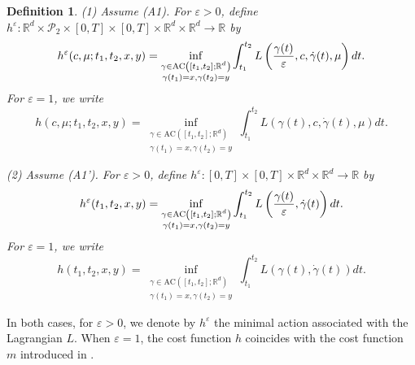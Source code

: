 \documentclass[reqno,11pt]{amsart}
\newtheorem{definition}[theorem]{Definition}
\numberwithin{equation}{section}
\newcommand{\R}{\mathbb{R}} %
\newcommand{\e}{\varepsilon}
\newcommand{\ep}{\varepsilon}
\newcommand{\nd}{\noindent}
\begin{document}
\begin{definition}\label{def:costf} (1) Assume (A1). For $\ep>0$, define $h^\e:\R^d \times \mathcal{P}_2 \times [0,T] \times [0,T] \times \R^d \times \R^d \to \mathbb{R}$ by
\begin{equation}\label{def:mep}
h^\e(c, \mu; t_1, t_2, x,y)=\inf_{\substack{\gamma\in {\rm AC}\left([t_1,t_2];\mathbb{R}^d\right)\\
\gamma(t_1)=x,\gamma(t_2)=y }}\int^{t_2}_{t_1}L\left(\frac{\gamma(t)}{\varepsilon}, c, \dot{\gamma}(t),\mu\right)dt.
\end{equation}
For $\ep=1$, we write
\begin{equation}\label{def:mep1}
h(c,\mu;t_1, t_2, x,y)=\inf_{\substack{\gamma\in \mathrm{AC}\left([t_1,t_2];\mathbb{R}^d\right)\\
\gamma(t_1)=x,\gamma(t_2)=y}}\int^{t_2}_{t_1}L\left(\gamma(t),c, \dot{\gamma}(t),\mu\right)dt.
\end{equation}

\noindent
(2) Assume (A1'). For $\ep>0$, define $h^\e: [0,T] \times [0,T] \times \R^d \times \R^d \to \mathbb{R}$ by
\begin{equation}\label{def:meps}
h^\e(t_1, t_2, x,y)=\inf_{\substack{\gamma\in {\rm AC}\left([t_1,t_2];\mathbb{R}^d\right)\\
\gamma(t_1)=x,\gamma(t_2)=y }}\int^{t_2}_{t_1}L\left(\frac{\gamma(t)}{\varepsilon}, \dot{\gamma}(t)\right)dt.
\end{equation}
For $\ep=1$, we write
\begin{equation}\label{def:meps1}
h(t_1, t_2, x,y)=\inf_{\substack{\gamma\in \mathrm{AC}\left([t_1,t_2];\mathbb{R}^d\right)\\
\gamma(t_1)=x,\gamma(t_2)=y}}\int^{t_2}_{t_1}L\left(\gamma(t),\dot{\gamma}(t)\right)dt.
\end{equation}

\end{definition}

\nd
In both cases, for $\ep>0$, we denote by $h^\e$ the minimal action
associated with the Lagrangian $L$. When $\ep=1$, the cost function $h$
coincides with the cost function $m$ introduced in \cite{TranYu2021}.
\end{document}

